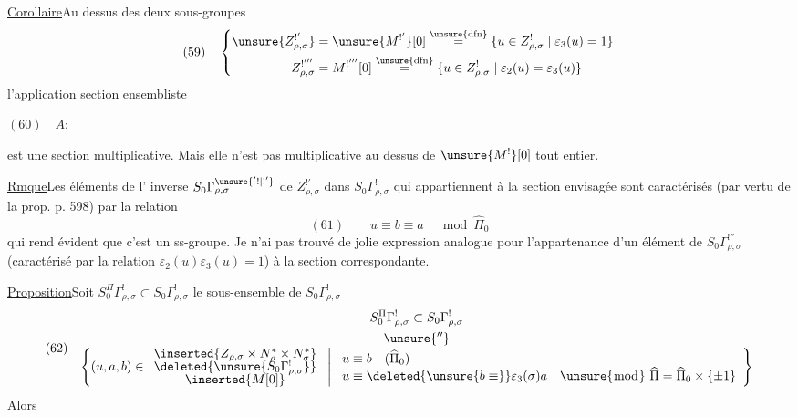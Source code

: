 \uline{Corollaire}\quad Au dessus des deux sous-groupes
\[
(59)\quad\left\{\begin{aligned}
\unsure{Z_{\rho,\sigma}^{!'}}&=\unsure{M^{!'}}[0]
\overset{\unsure{\mathrm{dfn}}}{=}
\{u\in Z_{\rho,\sigma}^{!}\mid\varepsilon_3(u)=1\}\\
Z_{\rho,\sigma}^{!'''}&=M^{!'''}[0]
\overset{\unsure{\mathrm{dfn}}}{=}
\{u\in Z_{\rho,\sigma}^{!}\mid\varepsilon_2(u)=\varepsilon_3(u)\}
\end{aligned}\right.
\]
l'application section ensembliste

\begin{samepage}
$(60)\quad A:$
\end{samepage}

est une section multiplicative. Mais elle n'est pas multiplicative au
dessus de $\unsure{M^{!}}[0]$ tout entier.

\uline{Rmque}\quad Les éléments de l' inverse
$S_0\Gamma_{\rho,\sigma}^{\unsure{'!|!'}}$ de $Z_{\rho,\sigma}^{!'}$
dans $S_0\Gamma_{\rho,\sigma}^{!}$ qui appartiennent à la section envisagée
sont caractérisés (par vertu de la prop. p. 598) par la relation
\[
(61)\qquad u\equiv b\equiv a\quad\bmod\widehat\Pi_0
\]
qui rend évident que c'est un ss-groupe.
Je n'ai pas trouvé de jolie expression analogue pour l'appartenance d'un
élément de $S_0\Gamma_{\rho,\sigma}^{!''}$
(caractérisé par la relation $\varepsilon_2(u)\varepsilon_3(u)=1$)
à la section correspondante.

\uline{Proposition}\quad Soit
$S_0^\Pi\Gamma_{\rho,\sigma}^{!}\subset S_0\Gamma_{\rho,\sigma}^{!}$
le sous-ensemble de $S_0\Gamma_{\rho,\sigma}^{!}$
\[
(62)\quad
\begin{gathered}
S_0^\Pi\Gamma_{\rho,\sigma}^{!}\subset S_0\Gamma_{\rho,\sigma}^{!}\\
\unsure{''}\\[-1ex]
\left\{(u,a,b)\in
\begin{array}{c}
\inserted{Z_{\rho,\sigma}\times N_\rho^*\times N_\sigma^*}\\[-.5ex]
\deleted{\unsure{S_0\Gamma_{\rho,\sigma}^{!}}}\\[-.5ex]
\inserted{M[0]}
\end{array}
\ \middle|\ 
\begin{array}{l}
u\equiv b\quad(\widehat\Pi_0)\\
u\equiv\deleted{\unsure{b\equiv}}\varepsilon_3(\sigma)a\quad
\unsure{\bmod}\ \widehat\Pi=\widehat\Pi_0\times\{\pm1\}
\end{array}
\right\}
\end{gathered}
\]
Alors

